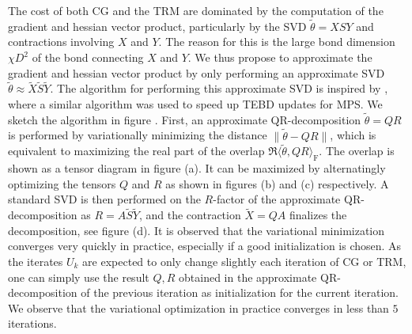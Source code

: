 The cost of both CG and the TRM are dominated by the computation of the gradient and hessian vector product, particularly by the SVD $\tilde{\theta} = XSY$ and contractions involving $X$ and $Y$. The reason for this is the large bond dimension $\chi D^2$ of the bond connecting $X$ and $Y$. We thus propose to approximate the gradient and hessian vector product by only performing an approximate SVD $\tilde{\theta} \approx \tilde{X}\tilde{S}\tilde{Y}$. The algorithm for performing this approximate SVD is inspired by \cite{cite:fast_time_evolution_of_mps_using_qr}, where a similar algorithm was used to speed up TEBD updates for MPS. We sketch the algorithm in figure . First, an approximate QR-decomposition $\tilde{\theta} = QR$ is performed by variationally minimizing the distance $\lVert \tilde{\theta} - QR \rVert$, which is equivalent to maximizing the real part of the overlap $\Re\langle\tilde{\theta},QR\rangle_\text{F}$. The overlap is shown as a tensor diagram in figure (a). It can be maximized by alternatingly optimizing the tensors $Q$ and $R$ as shown in figures (b) and (c) respectively. A standard SVD is then performed on the $R$-factor of the approximate QR-decomposition as $R = A\tilde{S}\tilde{Y}$, and the contraction $\tilde{X} = QA$ finalizes the decomposition, see figure (d). It is observed that the variational minimization converges very quickly in practice, especially if a good initialization is chosen. As the iterates $U_k$ are expected to only change slightly each iteration of CG or TRM, one can simply use the result $Q, R$ obtained in the approximate QR-decomposition of the previous iteration as initialization for the current iteration. We observe that the variational optimization in practice converges in less than $5$ iterations.
